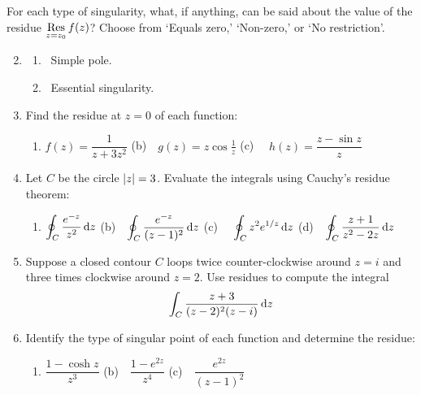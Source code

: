 \goodbreak


\begin{exercises}
	\exstart For each type of singularity, what, if anything, can be said about the value of the residue $\operatorname*{Res}\limits_{z=z_0}f(z)$? Choose from `Equals zero,' `Non-zero,' or `No restriction'.\vspace{-5pt}
	\begin{enumerate}\setcounter{enumi}{1}
	  \item[]\begin{enumerate}
		  \item {}\ Simple pole.
		  \setcounter{enumii}{2}
		  \item {}\ Essential singularity.
		\end{enumerate}
		
	  \item	Find the residue at $z=0$ of each function:
	  \begin{enumerate}
	    \item $f(z)=\dfrac 1{z+3z^2}$\qquad 
	    (b)\ \ $\displaystyle g(z)=z\cos\frac 1z$\qquad 
	    (c) \ \ $h(z)=\dfrac{z-\sin z}{z}$
		\end{enumerate}
		
		\item Let $C$ be the circle $\left| z\right|=3$. Evaluate the integrals using Cauchy's residue theorem:
	  \begin{enumerate}
	    \item $\displaystyle\oint_C\frac{e^{-z}}{z^2}\,{\mathrm{d} z}$\qquad 
	    (b)\ \ $\displaystyle\oint_C\frac{e^{-z}}{(z-1)^2}\,{\mathrm{d} z}$\qquad 
	    (c) \ \ $\displaystyle\oint_Cz^2e^{1/z}\,{\mathrm{d} z}$\qquad 
	    (d)\ \ $\displaystyle\oint_C\frac{z+1}{z^2-2z}\,{\mathrm{d} z}$
		\end{enumerate}
		
		
		\item Suppose a closed contour $C$ loops twice counter-clockwise around $z=i$ and three times clockwise around $z=2$. Use residues to compute the integral
		\[
			\int_C\frac{z+3}{(z-2)^2(z-i)}\,{\mathrm{d} z}
		\]
		
		
		\item Identify the type of singular point of each function and determine the residue:
		\begin{enumerate}
		  \item $\dfrac{1-\cosh z}{z^3}$\qquad 
		  (b)\ \ $\dfrac{1-e^{2z}}{z^4}$\qquad 
		  (c)\ \ $\dfrac{e^{2z}}{(z-1)^2}$
		\end{enumerate}
		

\end{enumerate}
\end{exercises}
